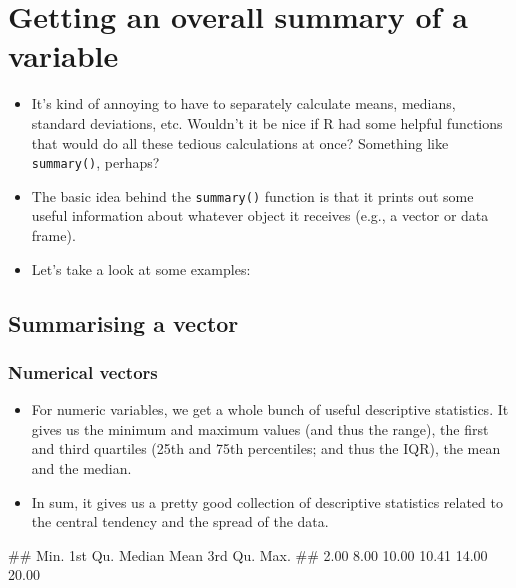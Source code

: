 \documentclass[
]{book}
\newenvironment{Shaded}{\begin{snugshade}}{\end{snugshade}}
\newcommand{\FunctionTok}[1]{\textcolor[rgb]{0.13,0.29,0.53}{\textbf{#1}}}
\newcommand{\NormalTok}[1]{#1}
\newcommand{\SpecialCharTok}[1]{\textcolor[rgb]{0.81,0.36,0.00}{\textbf{#1}}}
\providecommand{\tightlist}{%
  \setlength{\itemsep}{0pt}\setlength{\parskip}{0pt}}
\begin{document}
\section{Getting an overall summary of a variable}\label{summary}

\begin{itemize}
\tightlist
\item
  It's kind of annoying to have to separately calculate means, medians, standard deviations, etc. Wouldn't it be nice if R had some helpful functions that would do all these tedious calculations at once? Something like \texttt{summary()}, perhaps?
\item
  The basic idea behind the \texttt{summary()} function is that it prints out some useful information about whatever object it receives (e.g., a vector or data frame).
\item
  Let's take a look at some examples:
\end{itemize}

\subsection{Summarising a vector}\label{summarising-a-vector}

\subsubsection{Numerical vectors}\label{numerical-vectors}

\begin{itemize}
\tightlist
\item
  For numeric variables, we get a whole bunch of useful descriptive statistics. It gives us the minimum and maximum values (and thus the range), the first and third quartiles (25th and 75th percentiles; and thus the IQR), the mean and the median.
\item
  In sum, it gives us a pretty good collection of descriptive statistics related to the central tendency and the spread of the data.
\end{itemize}

\begin{Shaded}
\end{Shaded}

\begin{Shaded}
\begin{Highlighting}[]
\NormalTok{\#\#    Min. 1st Qu.  Median    Mean 3rd Qu.    Max. }
\NormalTok{\#\#    2.00    8.00   10.00   10.41   14.00   20.00}
\end{Highlighting}
\end{Shaded}
\end{document}
